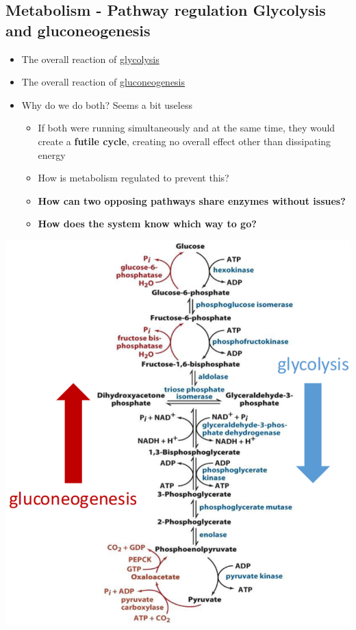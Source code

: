 \documentclass[10pt]{article}
\begin{document}
\subsection*{Metabolism - Pathway regulation Glycolysis and gluconeogenesis}
\begin{itemize}
	\item The overall reaction of \underline{glycolysis}
	\item The overall reaction of \underline{gluconeogenesis}
	\item Why do we do both?  Seems a bit useless
	\begin{itemize}
        \item If both were running simultaneously and at the same time, they would create a \textbf{futile cycle}, creating no overall effect other than dissipating energy
        \item How is metabolism regulated to prevent this?
        \item \textbf{How can two opposing pathways share enzymes without issues?}
        \item \textbf{How does the system know which way to go?}
    \end{itemize}
\end{itemize}
\begin{center} 
	\includegraphics*[scale=0.6]{L2_18.png}
\end{center}
\end{document}
